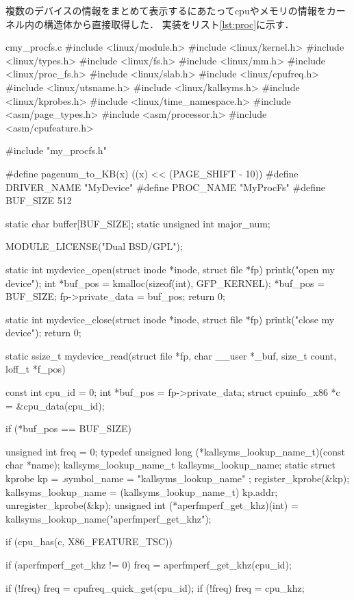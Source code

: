 複数のデバイスの情報をまとめて表示するにあたってcpuやメモリの情報をカーネル内の構造体から直接取得した．
実装をリスト\ref{lst:proc}に示す．
\begin{longlisting}
\begin{myminted}{c}{my_procfs.c}
#include <linux/module.h>
#include <linux/kernel.h>
#include <linux/types.h>
#include <linux/fs.h>
#include <linux/mm.h>
#include <linux/proc_fs.h>
#include <linux/slab.h>
#include <linux/cpufreq.h>
#include <linux/utsname.h>
#include <linux/kallsyms.h>
#include <linux/kprobes.h>
#include <linux/time_namespace.h>
#include <asm/page_types.h>
#include <asm/processor.h>
#include <asm/cpufeature.h>

#include "my_procfs.h"

#define pagenum_to_KB(x) ((x) << (PAGE_SHIFT - 10))
#define DRIVER_NAME "MyDevice"
#define PROC_NAME "MyProcFs"
#define BUF_SIZE 512

static char buffer[BUF_SIZE];
static unsigned int major_num;

MODULE_LICENSE("Dual BSD/GPL");


static int mydevice_open(struct inode *inode, struct file *fp) {
    printk("open my device\n");
    int *buf_pos = kmalloc(sizeof(int), GFP_KERNEL);
    *buf_pos = BUF_SIZE;
    fp->private_data = buf_pos;
    return 0;
}

static int mydevice_close(struct inode *inode, struct file *fp) {
    printk("close my device\n");
    return 0;
}

static ssize_t mydevice_read(struct file *fp, char __user *_buf, size_t count, loff_t *f_pos) {
    const int cpu_id = 0;
    int *buf_pos = fp->private_data;
    struct cpuinfo_x86 *c = &cpu_data(cpu_id);

    if (*buf_pos == BUF_SIZE) {
        unsigned int freq = 0;
        typedef unsigned long (*kallsyms_lookup_name_t)(const char *name);
        kallsyms_lookup_name_t kallsyms_lookup_name;
        static struct kprobe kp = {
           .symbol_name = "kallsyms_lookup_name"
        };
        register_kprobe(&kp);
        kallsyms_lookup_name = (kallsyms_lookup_name_t) kp.addr;
        unregister_kprobe(&kp);
        unsigned int (*aperfmperf_get_khz)(int) = kallsyms_lookup_name("aperfmperf_get_khz");
     
        if (cpu_has(c, X86_FEATURE_TSC)) {
            if (aperfmperf_get_khz != 0) freq = aperfmperf_get_khz(cpu_id);

            if (!freq) freq = cpufreq_quick_get(cpu_id);
            if (!freq) freq = cpu_khz;
        }

}}
\end{myminted}
\end{longlisting}
